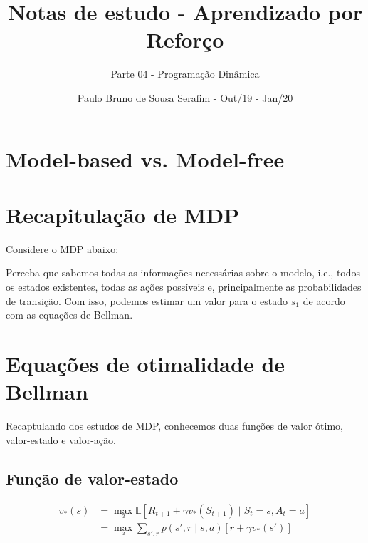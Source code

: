 \documentclass{article}
\title{Notas de estudo - Aprendizado por Reforço}
\author{Parte 04 - Programação Dinâmica}
\date{Paulo Bruno de Sousa Serafim - Out/19 - Jan/20}
\begin{document}
\maketitle

    \section{Model-based vs. Model-free}

        \begin{center}
        \mdpthreestatenoprobs
        \end{center}

    \section{Recapitulação de MDP}
    
        Considere o MDP abaixo:
        
        \begin{center}
        \mdpthreestate
        \end{center}
        
        Perceba que sabemos todas as informações necessárias sobre o modelo, i.e., todos os estados existentes, todas as ações possíveis e, principalmente as probabilidades de transição. Com isso, podemos estimar um valor para o estado $s_1$ de acordo com as equações de Bellman.
    
    \section{Equações de otimalidade de Bellman}
    
        Recaptulando dos estudos de MDP, conhecemos duas funções de valor ótimo, valor-estado e valor-ação.
    
        \subsection{Função de valor-estado}
        
            \begin{equation}
                \begin{split}
                    v_*(s) & = \max_a \mathbb{E} \left[ R_{t+1} + \gamma v_*(S_{t+1}) \mid S_t = s, A_t = a \right] \\
                    & = \max_a \sum_{s', r} p(s',r \mid s,a) \left[ r + \gamma v_*(s') \right]
                \end{split}
            \end{equation}
        
\end{document}
